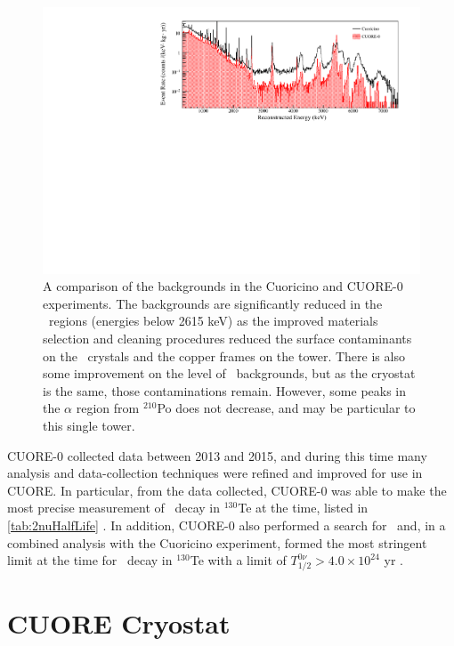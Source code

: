 \begin{figure}[htpb]
    \centering
    \includegraphics[width=\linewidth]{Figures/CUORE-0_vs_Cuoricino.pdf}
    \caption[A comparison of the backgrounds in the Cuoricino and CUORE-0 exeperiments.]
    {A comparison of the backgrounds in the Cuoricino and CUORE-0 experiments.
    The backgrounds are significantly reduced in the \gamma~regions (energies below 2615 keV) as the improved materials selection and cleaning procedures reduced the surface contaminants on the \teotwo~crystals and the copper frames on the tower.
    There is also some improvement on the level of \gamma~backgrounds, but as the cryostat is the same, those contaminations remain.
    However, some peaks in the $\alpha$ region from $^{210}$Po does not decrease, and may be particular to this single tower.}
    \label{fig:cuore-0_vs_cuoricino}
\end{figure}

CUORE-0 collected data between 2013 and 2015, and during this time many analysis and data-collection techniques were refined and improved for use in CUORE.
In particular, from the data collected, CUORE-0 was able to make the most precise measurement of \twonubb~decay in $^{130}$Te at the time, listed in \autoref{tab:2nuHalfLife} \cite{Alduino:2016vtd}.
In addition, CUORE-0 also performed a search for \zeronubb~and, in a combined analysis with the Cuoricino experiment, formed the most stringent limit at the time for \zeronubb~decay in $^{130}$Te with a limit of $T^{0ν}_{1/2}>4.0\times10^{24}$ yr \cite{Alfonso:2015wka}.

\section{CUORE Cryostat}
\label{sec:CUORE Cryostat}

